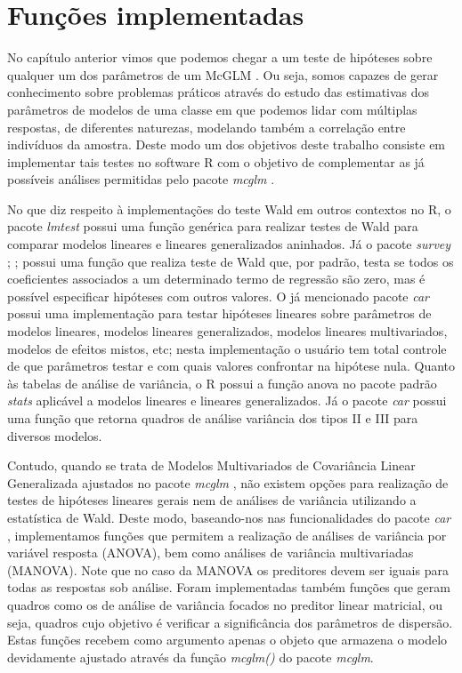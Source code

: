 
\chapter{Funções implementadas}

\label{cap:funcoes}


No capítulo anterior vimos que podemos chegar a um teste de hipóteses sobre qualquer um dos parâmetros de um McGLM \citep{Bonat16}. Ou seja, somos capazes de gerar conhecimento sobre problemas práticos através do estudo das estimativas dos parâmetros de modelos de uma classe em que podemos lidar com múltiplas respostas, de diferentes naturezas, modelando também a correlação entre indivíduos da amostra. Deste modo um dos objetivos deste trabalho consiste em implementar tais testes no software R \citep{softwareR} com o objetivo de complementar as já possíveis análises permitidas pelo pacote \emph{mcglm} \citep{mcglm}.

No que diz respeito à implementações do teste Wald em outros contextos no R, o pacote \emph{lmtest} \citep{lmtest} possui uma função genérica para realizar testes de Wald para comparar modelos lineares e lineares generalizados aninhados. Já o pacote \emph{survey} \citep{survey1}; \citep{survey2};\citep{survey3} possui uma função que realiza teste de Wald que, por padrão, testa se todos os coeficientes associados a um determinado termo de regressão são zero, mas é possível especificar hipóteses com outros valores. O já mencionado pacote \emph{car} \citep{car} possui uma implementação para testar hipóteses lineares sobre parâmetros de modelos lineares, modelos lineares generalizados, modelos lineares multivariados, modelos de efeitos mistos, etc; nesta implementação o usuário tem total controle de que parâmetros testar e com quais valores confrontar na hipótese nula. Quanto às tabelas de análise de variância, o R possui a função anova no pacote padrão \emph{stats} \citep{softwareR} aplicável a modelos lineares e lineares generalizados. Já o pacote \emph{car} \citep{car} possui uma função que retorna quadros de análise variância dos tipos II e III para diversos modelos. 

Contudo, quando se trata de Modelos Multivariados de Covariância Linear Generalizada ajustados no pacote \emph{mcglm} \citep{mcglm}, não existem opções para realização de testes de hipóteses lineares gerais nem de análises de variância utilizando a estatística de Wald. Deste modo, baseando-nos nas funcionalidades do pacote \emph{car} \citep{car}, implementamos funções que permitem a realização de análises de variância por variável resposta (ANOVA), bem como análises de variância multivariadas (MANOVA). Note que no caso da MANOVA os preditores devem ser iguais para todas as respostas sob análise. Foram implementadas também funções que geram quadros como os de análise de variância focados no preditor linear matricial, ou seja, quadros cujo objetivo é verificar a significância dos parâmetros de dispersão. Estas funções recebem como argumento apenas o objeto que armazena o modelo devidamente ajustado através da função \emph{mcglm()} do pacote \emph{mcglm}.


